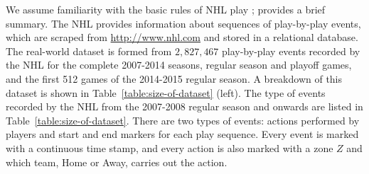 \documentclass[runningheads,a4paper]{llncs}
\begin{document}
We assume familiarity with the basic rules of NHL play%
; \cite{Routley2015a} provides a brief summary.
%
%
The NHL provides information about sequences of play-by-play events, which are scraped from \url{http://www.nhl.com} and stored in a relational database. The real-world dataset is formed from $2,827,467$ play-by-play events recorded by the NHL for the complete 2007-2014 seasons, regular season and playoff games, and the first 512 games of the 2014-2015 regular season. A breakdown of this dataset is shown in Table~\ref{table:size-of-dataset} (left).
The type of events recorded by the NHL from the 2007-2008 regular season and onwards are listed in Table~\ref{table:size-of-dataset}. There are two types of events: actions performed by players and start and end markers for each play sequence. Every event is marked with a continuous time stamp, and every action is also marked with a zone $Z$ and which team, Home or Away, carries out the action.
\end{document}
